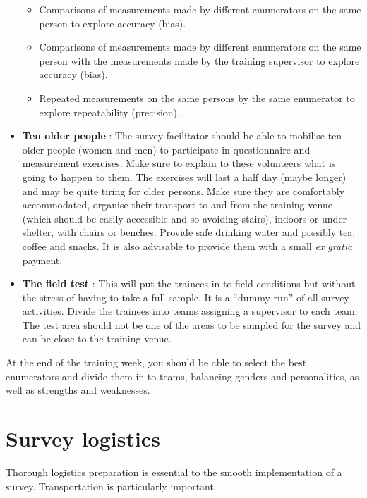 \documentclass[12pt,a4paper]{book}
\theoremstyle{definition}
\theoremstyle{definition}
\theoremstyle{definition}
\theoremstyle{remark}
\begin{document}
\begin{itemize}
  \begin{itemize}
  \item
    Comparisons of measurements made by different enumerators on the
    same person to explore accuracy (bias).
  \item
    Comparisons of measurements made by different enumerators on the
    same person with the measurements made by the training supervisor to
    explore accuracy (bias).
  \item
    Repeated measurements on the same persons by the same enumerator to
    explore repeatability (precision).
  \end{itemize}
\item
  \textbf{Ten older people} : The survey facilitator should be able to
  mobilise ten older people (women and men) to participate in
  questionnaire and measurement exercises. Make sure to explain to these
  volunteers what is going to happen to them. The exercises will last a
  half day (maybe longer) and may be quite tiring for older persons.
  Make sure they are comfortably accommodated, organise their transport
  to and from the training venue (which should be easily accessible and
  so avoiding stairs), indoors or under shelter, with chairs or benches.
  Provide safe drinking water and possibly tea, coffee and snacks. It is
  also advisable to provide them with a small \emph{ex gratia} payment.
\item
  \textbf{The field test} : This will put the trainees in to field
  conditions but without the stress of having to take a full sample. It
  is a ``dummy run'' of all survey activities. Divide the trainees into
  teams assigning a supervisor to each team. The test area should not be
  one of the areas to be sampled for the survey and can be close to the
  training venue.
\end{itemize}

At the end of the training week, you should be able to select the best
enumerators and divide them in to teams, balancing genders and
personalities, as well as strengths and weaknesses.

\hypertarget{survey-logistics}{%
\section{Survey logistics}\label{survey-logistics}}

Thorough logistics preparation is essential to the smooth implementation
of a survey. Transportation is particularly important.
\end{document}
